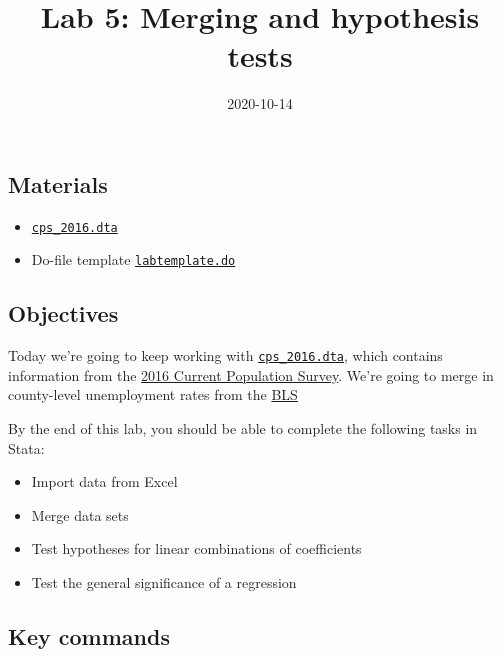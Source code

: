 \documentclass[
]{article}
\title{Lab 5: Merging and hypothesis tests}
\author{}
\date{2020-10-14}
\providecommand{\tightlist}{%
  \setlength{\itemsep}{0pt}\setlength{\parskip}{0pt}}
\begin{document}
\maketitle

\hypertarget{materials}{%
\subsection*{Materials}\label{materials}}

\begin{itemize}
\tightlist
\item
  \href{../materials/cps_2016.dta}{\texttt{cps\_2016.dta}}
\item
  Do-file template
  \href{../materials/labtemplate_f20.do}{\texttt{labtemplate.do}}
\end{itemize}

\hypertarget{objectives}{%
\subsection*{Objectives}\label{objectives}}

Today we're going to keep working with
\href{../materials/cps_2016.dta}{\texttt{cps\_2016.dta}}, which contains
information from the \href{https://cps.ipums.org/cps/}{2016 Current
Population Survey}. We're going to merge in county-level unemployment
rates from the \href{https://www.bls.gov/lau/tables.htm}{BLS}

By the end of this lab, you should be able to complete the following
tasks in Stata:

\begin{itemize}
\item
  Import data from Excel
\item
  Merge data sets
\item
  Test hypotheses for linear combinations of coefficients
\item
  Test the general significance of a regression
\end{itemize}

\hypertarget{key-commands}{%
\subsection*{Key commands}\label{key-commands}}
\end{document}
